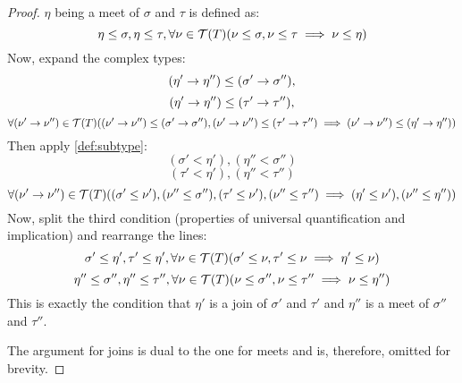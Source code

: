 \documentclass[main.tex]{subfiles}
\begin{document}
\begin{proof}
    $\eta$ being a meet of $\sigma$ and $\tau$ is defined as:
    \[
        \eta \leq \sigma, \eta \leq \tau,
            \forall \nu \in \mathcal{T}( T ) (\nu \leq \sigma, \nu \leq \tau \implies \nu \leq \eta)
    \]
    Now, expand the complex types:
    \[    (\eta' \rightarrow \eta'') \leq (\sigma' \rightarrow \sigma''),
    \]
    \[    (\eta' \rightarrow \eta'') \leq (\tau' \rightarrow \tau''),
    \]
    \[
            \forall (\nu' \rightarrow \nu'') \in \mathcal{T}( T ) ((\nu' \rightarrow \nu'') \leq (\sigma' \rightarrow \sigma''), (\nu' \rightarrow \nu'') \leq (\tau' \rightarrow \tau'') \implies (\nu' \rightarrow \nu'') \leq (\eta' \rightarrow \eta''))
    \]
    Then apply \cref{def:subtype}:
    \[    (\sigma' \less \eta') , (\eta'' \less \sigma'')
    \]
    \[    (\tau' \less \eta') , (\eta'' \less \tau'')
    \]
    \[
            \forall (\nu' \rightarrow \nu'') \in \mathcal{T}( T )
            ((\sigma' \leq \nu'), (\nu'' \leq \sigma''),
             (\tau' \leq \nu'), (\nu'' \leq \tau'')
             \implies (\eta' \leq \nu'), (\nu'' \leq \eta''))
    \]
    Now, split the third condition (properties of universal quantification and implication)
    and rearrange the lines:
    \[
        \sigma' \leq \eta', \tau' \leq \eta',
            \forall \nu \in \mathcal{T}( T ) (\sigma' \leq \nu, \tau' \leq \nu \implies \eta' \leq \nu)
    \]
    \[
        \eta'' \leq \sigma'', \eta'' \leq \tau'',
            \forall \nu \in \mathcal{T}( T ) (\nu \leq \sigma'', \nu \leq \tau'' \implies \nu \leq \eta'')
    \]
    This is exactly the condition that $\eta'$ is a join of $\sigma'$
    and $\tau'$ and
    $\eta''$ is a meet of $\sigma''$ and $\tau''$.

    The argument for joins is dual to the one for meets and is, therefore, omitted for brevity.
\end{proof}
\end{document}
